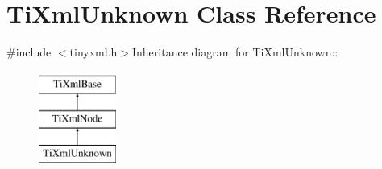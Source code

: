 \hypertarget{class_ti_xml_unknown}{
\section{TiXmlUnknown Class Reference}
\label{class_ti_xml_unknown}
}


{\ttfamily \#include $<$tinyxml.h$>$}Inheritance diagram for TiXmlUnknown::\begin{figure}[H]
\begin{center}
\leavevmode
\includegraphics[height=3cm]{class_ti_xml_unknown}
\end{center}
\end{figure}
